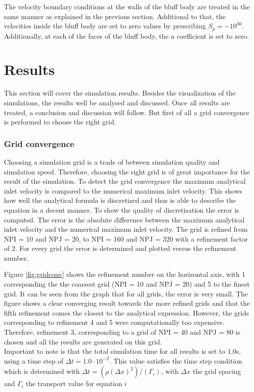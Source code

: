 \documentclass{CFD2017}
\begin{document}
The velocity boundary conditions at the walls of the bluff body are treated in the same manner as explained in the previous section. Additional to that, the velocities inside the bluff body are set to zero values by prescribing $S_p=-10^{30}$. Additionally, at each of the faces of the bluff body, the $a$ coefficient is set to zero. \\


\section{Results}
This section will cover the simulation results. Besides the visualization of the simulations, the results well be analysed and discussed. Once all results are treated, a conclusion and discussion will follow. But first of all a grid convergence is performed to choose the right grid.\\
\subsubsection{Grid convergence}
Choosing a simulation grid is a trade of between simulation quality and simulation speed. Therefore, choosing the right grid is of great importance for the result of the simulation. To detect the grid convergence the maximum analytical inlet velocity is compared to the numerical maximum inlet velocity. This shows how well the analytical formula is discretized and thus is able to describe the equation in a decent manner. To show the quality of discretisation the error is computed. The error is the absolute difference between the maximum analytical inlet velocity and the numerical maximum inlet velocity. The grid is refined from NPI = 10 and NPJ = 20, to NPI = 160 and NPJ = 320 with a refinement factor of 2. For every grid the error is determined and plotted versus the refinement number.


Figure \ref{fig:gridconv} shows the refinement number on the horizontal axis, with 1 corresponding the the coarsest grid (NPI = 10 and NPJ = 20) and 5 to the finest grid. It can be seen from the graph that for all grids, the error is very small. The figure shows a clear converging result towards the more refined grids and that the fifth refinement comes the closest to the analytical expression. However, the grids corresponding to refinement 4 and 5 were computationally too expensive. Therefore, refinement 3, corresponding to a grid of NPI = 40 and NPJ = 80 is chosen and all the results are generated on this grid.\\
Important to note is that the total simulation time for all results is set to 1.0s, using a time step of $\Delta t=1.0 \cdot 10^{-2}$. This value satisfies the time step condition which is determined with $\Delta t = (\rho (\Delta x)^2)/(\Gamma_i)$, with $\Delta x$ the grid spacing and $\Gamma_i$ the transport value for equation $i$
\end{document}
